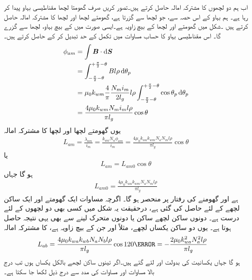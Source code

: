 اب ہم دو لچھوں کا مشترکہ امالہ حاصل کرتے ہیں۔تصور کریں صرف  گھومتا لچھا مقناطیسی بہاو پیدا کر رہا ہے۔ ہم  بہاو کے اس حصہ سے، جو  لچھا  سے گزرتا ہے، گھومتے لچھا اور  لچھا  کا مشترکہ امالہ حاصل کرتے ہیں ۔شکل   میں گھومتے اور  لچھا کے بیچ زاویہ  ہے۔ایسی صورت میں   کے بیچ بہاو،  لچھا سے گزرے گا۔ اس مقناطیسی بہاو کا حساب مساوات   میں تکمل کے حد تبدیل کر کے حاصل کرتے ہیں۔
\begin{gather}
\begin{aligned}
\phi_{am}&=\int \kvec{B} \cdot \dif \kvec{S}\\
&=\int_{-\frac{\pi}{2}-\theta}^{+\frac{\pi}{2}-\theta} B l \rho \dif \theta_p\\
&=\mu_0 k_{wm} \frac{4}{\pi}\frac{N_m i_m}{2 l_g} l \rho \int_{-\frac{\pi}{2}-\theta}^{+\frac{\pi}{2}-\theta} \cos \theta_p \dif \theta_p\\
&=\frac{4 \mu_0 k_{wm}  N_m i_m l \rho}{\pi l_g} \cos \theta
\end{aligned}
\end{gather}
یوں گھومتے لچھا اور  لچھا کا  مشترکہ امالہ
\begin{align}
L_{am}=\frac{\lambda_{am}}{i_m}=\frac{k_{wa} N_a \phi_{am}}{i_m}=\frac{4 \mu_0 k_{wa} k_{wm} N_a N_m l \rho}{\pi l_g} \cos \theta
\end{align}
یا
\begin{align}\label{مساوات_معاصر_ساکن_گھومتا_مشترکہ_امالہ}
L_{am}=L_{am0} \cos \theta
\end{align}
ہو گا جہاں
\begin{align}
L_{am0}=\frac{4 \mu_0 k_{wa} k_{wm} N_a N_m l \rho}{\pi l_g} 
\end{align}
ہے اور   گھومنے کی رفتار پر منحصر ہو گا۔ اگرچہ مساوات  ایک گھومتے اور ایک ساکن لچھے کے لئے حاصل کی گئی  ہے،  درحقیقت یہ  شکل  میں کسی بھی دو لچھوں کے لئے درست ہے۔  دونوں ساکن لچھے ساکن  یا دونوں متحرک لینے سے بھی یہی نتیجہ حاصل ہوتا ہے۔  یوں  دو ساکن  یکساں لچھے، مثلاً  اور  جن کے بیچ   زاویہ ہے،  کا  مشترکہ امالہ
\begin{align}
L_{ab}&=\frac{4 \mu_0 k_{wa} k_{wb} N_a N_b l \rho}{\pi l_g} \cos 120\degree=-\frac{2 \mu_0 k_{wa}^2  N_a^2 l \rho}{\pi l_g}
\end{align}
ہو گا جہاں یکسانیت کی  بدولت   اور  لئے گئے ہیں۔اگر تینوں ساکن لچھے بالکل یکساں ہوں  تب درج بالا مساوات اور مساوات  کی مدد سے درج ذیل  لکھا جا سکتا ہے۔ 
